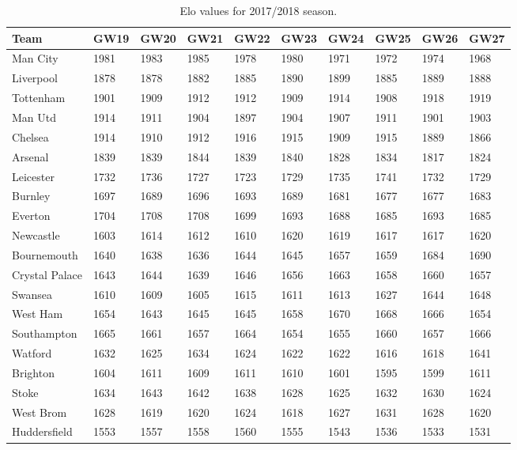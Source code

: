 \begin{table}[H]
\centering
\smaller
\caption{Elo values for 2017/2018 season.}
\label{my-label}
\begin{tabular}{|l|l|l|l|l|l|l|l|l|l|}
\hline
Team           & GW19 & GW20 & GW21 & GW22 & GW23 & GW24 & GW25 & GW26 & GW27 \\
\hline
Man City       & 1981 & 1983 & 1985 & 1978 & 1980 & 1971 & 1972 & 1974 & 1968 \\
Liverpool      & 1878 & 1878 & 1882 & 1885 & 1890 & 1899 & 1885 & 1889 & 1888 \\
Tottenham      & 1901 & 1909 & 1912 & 1912 & 1909 & 1914 & 1908 & 1918 & 1919 \\
Man Utd        & 1914 & 1911 & 1904 & 1897 & 1904 & 1907 & 1911 & 1901 & 1903 \\
Chelsea        & 1914 & 1910 & 1912 & 1916 & 1915 & 1909 & 1915 & 1889 & 1866 \\
Arsenal        & 1839 & 1839 & 1844 & 1839 & 1840 & 1828 & 1834 & 1817 & 1824 \\
Leicester      & 1732 & 1736 & 1727 & 1723 & 1729 & 1735 & 1741 & 1732 & 1729 \\
Burnley        & 1697 & 1689 & 1696 & 1693 & 1689 & 1681 & 1677 & 1677 & 1683 \\
Everton        & 1704 & 1708 & 1708 & 1699 & 1693 & 1688 & 1685 & 1693 & 1685 \\
Newcastle      & 1603 & 1614 & 1612 & 1610 & 1620 & 1619 & 1617 & 1617 & 1620 \\
Bournemouth    & 1640 & 1638 & 1636 & 1644 & 1645 & 1657 & 1659 & 1684 & 1690 \\
Crystal Palace & 1643 & 1644 & 1639 & 1646 & 1656 & 1663 & 1658 & 1660 & 1657 \\
Swansea        & 1610 & 1609 & 1605 & 1615 & 1611 & 1613 & 1627 & 1644 & 1648 \\
West Ham       & 1654 & 1643 & 1645 & 1645 & 1658 & 1670 & 1668 & 1666 & 1654 \\
Southampton    & 1665 & 1661 & 1657 & 1664 & 1654 & 1655 & 1660 & 1657 & 1666 \\
Watford        & 1632 & 1625 & 1634 & 1624 & 1622 & 1622 & 1616 & 1618 & 1641 \\
Brighton       & 1604 & 1611 & 1609 & 1611 & 1610 & 1601 & 1595 & 1599 & 1611 \\
Stoke          & 1634 & 1643 & 1642 & 1638 & 1628 & 1625 & 1632 & 1630 & 1624 \\
West Brom      & 1628 & 1619 & 1620 & 1624 & 1618 & 1627 & 1631 & 1628 & 1620 \\
Huddersfield   & 1553 & 1557 & 1558 & 1560 & 1555 & 1543 & 1536 & 1533 & 1531 \\
\hline
\end{tabular}
\end{table}


